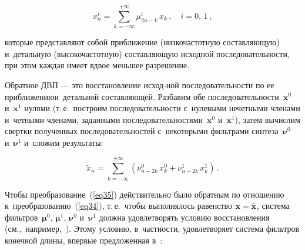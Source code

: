 \begin{multicols}{2}
\vspace*{2pt}

\noindent
\begin{equation}
\label{eq34}
x_n^i=\sum\limits_{k=-\infty}^{+\infty} \mu_{2n-k}^{i}\,x_k\,, \quad i=0,\,1\,,
\end{equation}

\vspace*{-2pt}

\noindent
которые представляют собой приближение (низкочастотную составляющую) и~детальную 
(высокочастотную) составляющую исходной последовательности, при этом каждая 
имеет вдвое меньшее разрешение.

Обратное ДВП --- это восстановление исход-\linebreak ной последовательности по ее 
приближению\linebreak и~детальной составляющей. Разбавим обе 
по\-сле\-до\-ва\-тель\-ности~$\mathbf{x}^{0}$ и~$\mathbf{x}^{1}$ нулями (т.\,е.\ 
построим последовательности с~нулевыми нечетными членами и~четными членами, 
заданными последовательностями~$\mathbf{x}^{0}$ и~$\mathbf{x}^{1}$), 
затем вычислим свертки полученных последовательностей с~некоторыми фильтрами 
синтеза~$\boldsymbol\nu^0$ и~$\boldsymbol\nu^1$ и~сложим результаты:

\vspace*{2pt}

\noindent
\begin{equation}
\label{eq35}
\tilde{x}_n =\sum\limits_{k=-\infty}^{+\infty}
\left(\nu_{n-2k}^{0}\,x_k^0 + \nu_{n-2k}^{1}\,x_k^1 \right) \,.
\end{equation}

\vspace*{-2pt}

\noindent
Чтобы преобразование~(\ref{eq35}) действительно было обратным по отношению 
к~преобразованию~(\ref{eq34}),
т.\,е.\ чтобы выполнялось равенство $\mathbf{x}\hm=\tilde{\mathbf{x}}$,
система фильтров~$\boldsymbol\mu^0$, $\boldsymbol\mu^1$, 
$\boldsymbol\nu^0$ и~$\boldsymbol\nu^1$ должна удовлетворять условию 
восстановления (см.,~например,~\cite{b06}). Этому условию, в~част\-ности, 
удовлетворяет система фильтров конечной длины, впервые предложенная в~\cite{b07}:

\pagebreak

\end{multicols}

